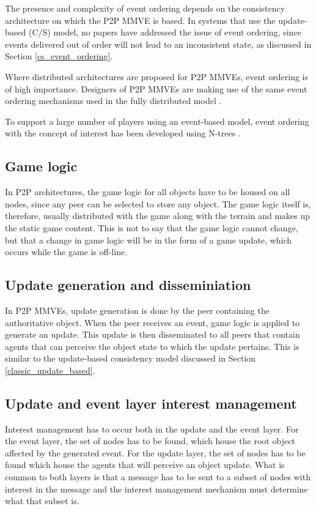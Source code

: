 The presence and complexity of event ordering depends on the consistency architecture on which the P2P MMVE is based. In systems that use the update-based (C/S) model, no papers have addressed the issue of event ordering, since events delivered out of order will not lead to an inconsistent state, as discussed in Section \ref{cs_event_ordering}.

Where distributed architectures are proposed for P2P MMVEs, event ordering is of high importance. Designers of P2P MMVEs are making use of the same event ordering mechanisms used in the fully distributed model \cite{hybrid_storage1}.

To support a large number of players using an event-based model, event ordering with the concept of interest has been developed using N-trees \cite{GauthierDickey_ntrees}.

\subsection{Game logic}

In P2P architectures, the game logic for all objects have to be housed on all nodes, since any peer can be selected to store any object. The game logic itself is, therefore, usually distributed with the game along with the terrain and makes up the static game content. This is not to say that the game logic cannot change, but that a change in game logic will be in the form of a game update, which occurs while the game is off-line.

\subsection{Update generation and disseminiation}

In P2P MMVEs, update generation is done by the peer containing the authoritative object. When the peer receives an event, game logic is applied to generate an update. This update is then disseminated to all peers that contain agents that can perceive the object state to which the update pertains. This is similar to the update-based consistency model discussed in Section \ref{classic_update_based}.

\subsection{Update and event layer interest management}
\label{key_challenges_im}

Interest management has to occur both in the update and the event layer. For the event layer, the set of nodes has to be found, which house the root object affected by the generated event. For the update layer, the set of nodes has to be found which house the agents that will perceive an object update. What is common to both layers is that a message has to be sent to a subset of nodes with interest in the message and the interest management mechanism must determine what that subset is.

